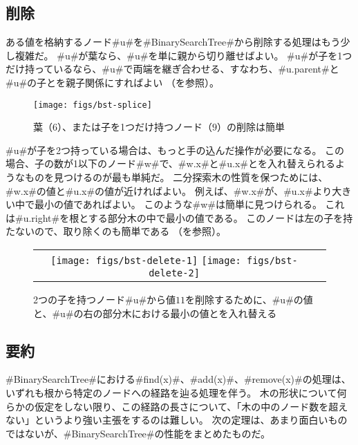 \subsection{削除}

ある値を格納するノード#u#を#BinarySearchTree#から削除する処理はもう少し複雑だ。
#u#が葉なら、#u#を単に親から切り離せばよい。
#u#が子を1つだけ持っているなら、#u#で両端を継ぎ合わせる、すなわち、#u.parent#と#u#の子とを親子関係にすればよい
（を参照）。

\begin{figure}
  \begin{center}
    \texttt{[image: figs/bst-splice]}
  \end{center}
  \caption{葉（$6$）、または子を1つだけ持つノード（$9$）の削除は簡単}
\end{figure}

#u#が子を2つ持っている場合は、もっと手の込んだ操作が必要になる。
この場合、子の数が1以下のノード#w#で、#w.x#と#u.x#とを入れ替えられるようなものを見つけるのが最も単純だ。
二分探索木の性質を保つためには、#w.x#の値と#u.x#の値が近ければよい。
例えば、#w.x#が、#u.x#より大きい中で最小の値であればよい。
このような#w#は簡単に見つけられる。
これは#u.right#を根とする部分木の中で最小の値である。
このノードは左の子を持たないので、取り除くのも簡単である
（を参照）。

\begin{figure}
  \begin{center}
    \begin{tabular}{cc}
    \texttt{[image: figs/bst-delete-1]}
    \texttt{[image: figs/bst-delete-2]}
    \end{tabular}
  \end{center}
  \caption{2つの子を持つノード#u#から値$11$を削除するために、#u#の値と、#u#の右の部分木における最小の値とを入れ替える}
\end{figure}

\subsection{要約}

#BinarySearchTree#における#find(x)#、#add(x)#、#remove(x)#の処理は、いずれも根から特定のノードへの経路を辿る処理を伴う。
木の形状について何らかの仮定をしない限り、この経路の長さについて、「木の中のノード数を超えない」というより強い主張をするのは難しい。
次の定理は、あまり面白いものではないが、#BinarySearchTree#の性能をまとめたものだ。

